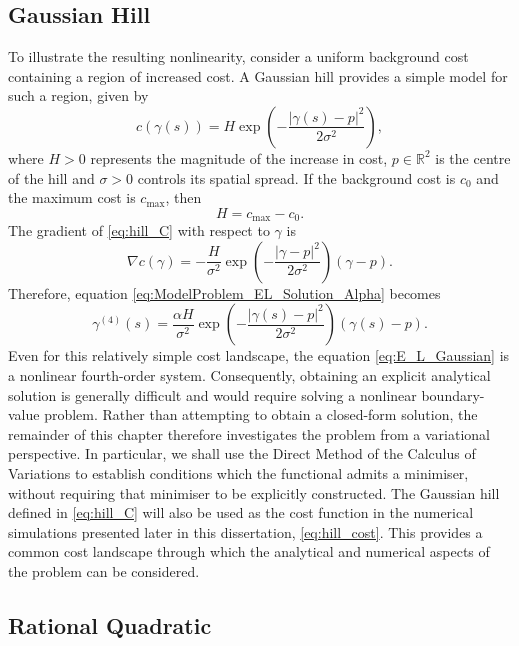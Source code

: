 \subsection{Gaussian Hill}
To illustrate the resulting nonlinearity, consider a uniform background cost containing a region of increased cost. A Gaussian hill provides a simple model for such a region, given by
\begin{equation}
\label{eq:hill_C}
c(\gamma(s))
=
H\exp\left(
-\frac{|\gamma(s)-p|^2}{2\sigma^2}
\right),
\end{equation}
where $H>0$ represents the magnitude of the increase in cost, $p\in\mathbb{R}^2$ is the centre of the hill and $\sigma>0$ controls its spatial spread. If the background cost is $c_0$ and the maximum cost is $c_{\max}$, then
$$
H=c_{\max}-c_0.
$$
The gradient of \eqref{eq:hill_C} with respect to $\gamma$ is
$$
\nabla c(\gamma)
=
-\frac{H}{\sigma^2}
\exp\left(
-\frac{|\gamma-p|^2}{2\sigma^2}
\right)
(\gamma-p).
$$
Therefore, equation \eqref{eq:ModelProblem_EL_Solution_Alpha} becomes
\begin{equation}
\label{eq:E_L_Gaussian}
\gamma^{(4)}(s)
=
\frac{\alpha H}{\sigma^2}
\exp\left(
-\frac{|\gamma(s)-p|^2}{2\sigma^2}
\right)
(\gamma(s)-p).
\end{equation}
Even for this relatively simple cost landscape, the equation \eqref{eq:E_L_Gaussian} is a nonlinear fourth-order system. Consequently, obtaining an explicit analytical solution is generally difficult and would require solving a nonlinear boundary-value problem. Rather than attempting to obtain a closed-form solution, the remainder of this chapter therefore investigates the problem from a variational perspective. In particular, we shall use the Direct Method of the Calculus of Variations to establish conditions which the functional admits a minimiser, without requiring that minimiser to be explicitly constructed. The Gaussian hill defined in \eqref{eq:hill_C} will also be used as the cost function in the numerical simulations presented later in this dissertation, \eqref{eq:hill_cost}. This provides a common cost landscape through which the analytical and numerical aspects of the problem can be considered.

\subsection{Rational Quadratic}

